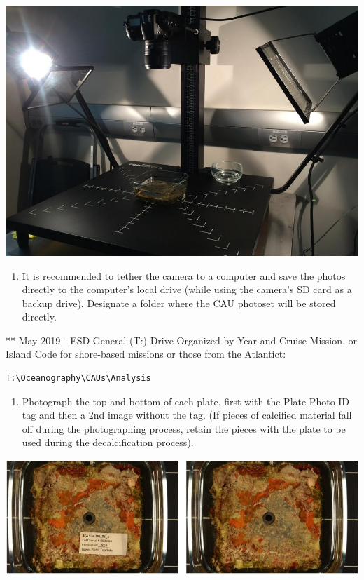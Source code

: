 \documentclass[]{book}
\providecommand{\tightlist}{%
  \setlength{\itemsep}{0pt}\setlength{\parskip}{0pt}}
\begin{document}
\includegraphics{images/CAU_photograph.jpg}

\begin{enumerate}
\def\labelenumi{\arabic{enumi}.}
\setcounter{enumi}{6}
\tightlist
\item
  It is recommended to tether the camera to a computer and save the photos directly to the computer's local drive (while using the camera's SD card as a backup drive). Designate a folder where the CAU photoset will be stored directly.
\end{enumerate}

** May 2019 - ESD General (T:) Drive Organized by Year and Cruise Mission, or Island Code for shore-based missions or those from the Atlantict:

\begin{verbatim}
T:\Oceanography\CAUs\Analysis  
\end{verbatim}

\begin{enumerate}
\def\labelenumi{\arabic{enumi}.}
\setcounter{enumi}{7}
\tightlist
\item
  Photograph the top and bottom of each plate, first with the Plate Photo ID tag and then a 2nd image without the tag. (If pieces of calcified material fall off during the photographing process, retain the pieces with the plate to be used during the decalcification process).
\end{enumerate}

\includegraphics{images/CAU_image.jpg}
\end{document}
